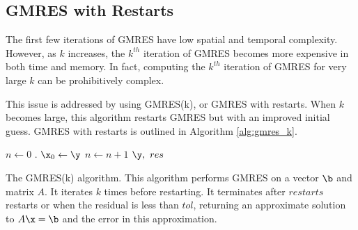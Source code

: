 \subsection*{GMRES with Restarts}
The first few iterations of GMRES have low spatial and temporal complexity. 
However, as $k$ increases, the $k^{th}$ iteration of GMRES becomes more expensive in both time and memory.
In fact, computing the $k^{th}$ iteration of GMRES for very large $k$ can be prohibitively complex.

This issue is addressed by using GMRES(k), or GMRES with restarts.
When $k$ becomes large, this algorithm restarts GMRES but with an improved initial guess.
GMRES with restarts is outlined in Algorithm \ref{alg:gmres_k}.


\begin{algorithm}
\begin{algorithmic}[1]
  \State $n \gets 0$ 
	.
    \State $\x_0 \gets \y$
    \State $n \gets n + 1$
    \EndWhile
    \State {} $\y, \,\, res$		
\EndProcedure
\end{algorithmic}
\caption{The GMRES(k) algorithm. This algorithm performs GMRES on a vector $\b$ and matrix $A$. It iterates $k$ times before restarting. 
It terminates after $restarts$ restarts or when the residual is less than $tol$, returning an approximate solution to $A\x=\b$ and the error in this approximation. }
\label{alg:gmres_k}
\end{algorithm}





